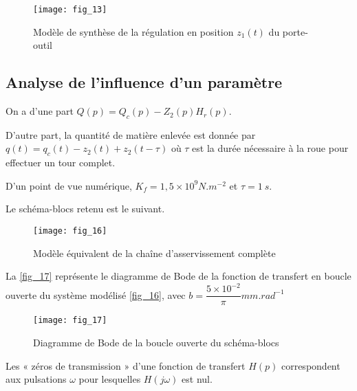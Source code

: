 \begin{multicols}{2}
\begin{figure}[H]
\centering
\texttt{[image: fig\_13]}
\caption{Modèle de synthèse de la régulation en position $z_1(t)$ du porte-outil \label{fig_13}}
\end{figure}




\subsection*{Analyse de l'influence d'un paramètre}

On a d'une part $Q(p) =Q_c (p)-Z_2(p)H_r (p)$. 

D'autre part, la quantité de matière enlevée est donnée par $q(t)=q_c(t)-z_2(t)+z_2\left( t-\tau\right)$ où $\tau$ est la durée nécessaire à la roue pour effectuer
un tour complet. 

D’un point de vue numérique, $K_f = 1,5 \times 10^9 \si{N.m^{-2}}$ et $\tau = \SI{1}{s}$. 


Le schéma-blocs retenu est le suivant. 

\begin{figure}[H]
\centering
\texttt{[image: fig\_16]}
\caption{Modèle équivalent de la chaîne d'asservissement complète\label{fig_16}}
\end{figure}


La \autoref{fig_17} représente le diagramme de Bode de la fonction de transfert en boucle ouverte du système modélisé
\autoref{fig_16}, avec $b=\dfrac{5\times 10^{-2}}{\pi} \si{mm.rad^{-1}}$

\begin{figure}[H]
\centering
\texttt{[image: fig\_17]}
\caption{Diagramme de Bode de la boucle ouverte du schéma-blocs\label{fig_17}}
\end{figure}


Les « zéros de transmission » d’une fonction de transfert $H(p)$ correspondent aux pulsations $\omega$ pour lesquelles
$H\left(j \omega\right)$ est nul.



\ifprof
\else
\end{multicols}
\fi

